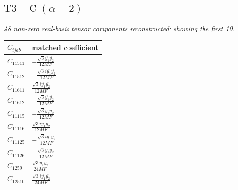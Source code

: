 \documentclass[9pt]{article}
\begin{document}
\subsection*{$ \mathrm{T3-C}\;(\alpha=2) $}
\textit{48 non-zero real-basis tensor components reconstructed; showing the first 10.}
\begin{longtable}{@{}ll@{}}
\toprule
$C_{ijab}$ & matched coefficient \\
\midrule
$C_{11511}$ & $ - \frac{\sqrt{3} \overline{y_{1}} \overline{y_{2}}}{12 MF} $ \\
$C_{11512}$ & $ - \frac{\sqrt{3} i \overline{y_{1}} \overline{y_{2}}}{12 MF} $ \\
$C_{11611}$ & $ \frac{\sqrt{3} i \overline{y_{1}} \overline{y_{2}}}{12 MF} $ \\
$C_{11612}$ & $ - \frac{\sqrt{3} \overline{y_{1}} \overline{y_{2}}}{12 MF} $ \\
$C_{11115}$ & $ - \frac{\sqrt{3} \overline{y_{1}} \overline{y_{2}}}{12 MF} $ \\
$C_{11116}$ & $ \frac{\sqrt{3} i \overline{y_{1}} \overline{y_{2}}}{12 MF} $ \\
$C_{11125}$ & $ - \frac{\sqrt{3} i \overline{y_{1}} \overline{y_{2}}}{12 MF} $ \\
$C_{11126}$ & $ - \frac{\sqrt{3} \overline{y_{1}} \overline{y_{2}}}{12 MF} $ \\
$C_{1259}$ & $ \frac{\sqrt{3} \overline{y_{1}} \overline{y_{2}}}{24 MF} $ \\
$C_{12510}$ & $ \frac{\sqrt{3} i \overline{y_{1}} \overline{y_{2}}}{24 MF} $ \\
\bottomrule
\end{longtable}
\end{document}
